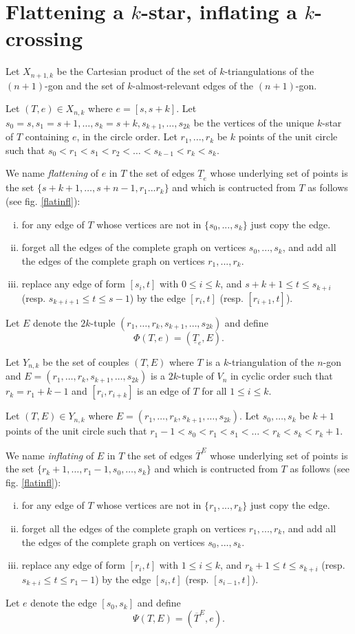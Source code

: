 \documentclass[12pt]{amsart}
\begin{document}
\section{Flattening a $k$-star, inflating a $k$-crossing}

Let $X_{n+1,k}$ be the Cartesian product of the set of $k$-triangulations of the $(n+1)$-gon and the set of $k$-almost-relevant edges of the $(n+1)$-gon.

Let $(T,e)\in X_{n,k}$ where $e=[s,s+k]$.
Let $s_0=s,s_1=s+1,\ldots,s_k=s+k,s_{k+1},\ldots,s_{2k}$ be the vertices of the unique $k$-star of $T$ containing $e$, in the circle order. Let $r_1,...,r_k$ be $k$ points of the unit circle such that $s_0<r_1<s_1<r_2<\ldots<s_{k-1}<r_k<s_k$.

We name \emph{flattening} of $e$ in $T$ the set of edges $\underline{T}_e$ whose underlying set of points is the set $\{s+k+1,\ldots,s+n-1,r_1...r_k\}$ and which is contructed from $T$ as follows (see fig. \ref{flatinfl}):
\begin{enumerate}[(i)]
\item for any edge of $T$ whose vertices are not in $\{s_0,...,s_k\}$ just copy the edge.
\item forget all the edges of the complete graph on vertices $s_0,...,s_k$, and add all the edges of the complete graph on vertices $r_1,...,r_k$.
\item replace any edge of form $[s_i,t]$ with $0\le i\le k$, and $s+k+1\le t \le s_{k+i}$ (resp. $s_{k+i+1}\le t\le s-1$) by the edge $[r_i,t]$ (resp. $[r_{i+1},t]$).
\end{enumerate}
Let $E$ denote the $2k$-tuple $(r_1,\ldots,r_k,s_{k+1},\ldots,s_{2k})$ and define $$\Phi(T,e)=(\underline{T}_e,E).$$

\bigskip
Let $Y_{n,k}$ be the set of couples $(T,E)$ where $T$ is a $k$-triangulation of the $n$-gon and $E=(r_1,\ldots,r_k,s_{k+1},\ldots,s_{2k})$ is a $2k$-tuple of $V_{n}$ in cyclic order such that $r_k=r_1+k-1$ and $[r_i,r_{i+k}]$ is an edge of $T$ for all $1\le i\le k$.

Let $(T,E)\in Y_{n,k}$ where $E=(r_1,\ldots,r_k,s_{k+1},\ldots,s_{2k})$. Let $s_0,\ldots,s_k$ be $k+1$ points of the unit circle such that $r_1-1<s_0<r_1<s_1<\ldots<r_k<s_k<r_k+1$.

We name \emph{inflating} of $E$ in $T$ the set of edges $\overline{T}^E$ whose underlying set of points is the set $\{r_k+1,\ldots,r_1-1,s_0,\ldots,s_k\}$ and which is contructed from $T$ as follows (see fig. \ref{flatinfl}):
\begin{enumerate}[(i)]
\item for any edge of $T$ whose vertices are not in $\{r_1,...,r_k\}$ just copy the edge.
\item forget all the edges of the complete graph on vertices $r_1,...,r_k$, and add all the edges of the complete graph on vertices $s_0,...,s_k$.
\item replace any edge of form $[r_i,t]$ with $1\le i\le k$, and $r_k+1\le t \le s_{k+i}$ (resp. $s_{k+i}\le t\le r_1-1$) by the edge $[s_i,t]$ (resp. $[s_{i-1},t]$).
\end{enumerate}
Let $e$ denote the edge $[s_0,s_k]$ and define $$\Psi(T,E)=(\overline{T}^E,e).$$
\end{document}
